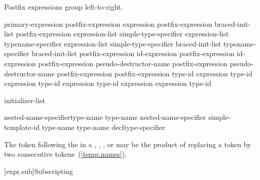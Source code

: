 \pnum
Postfix expressions group left-to-right.

\begin{bnf}
\br
    primary-expression\br
    postfix-expression \terminal{[} expression \terminal{]}\br
    postfix-expression \terminal{[} braced-init-list \terminal{]}\br
    postfix-expression \terminal{(} expression-list\opt \terminal{)}\br
    simple-type-specifier \terminal{(} expression-list\opt \terminal{)}\br
    typename-specifier \terminal{(} expression-list\opt \terminal{)}\br
    simple-type-specifier braced-init-list\br
    typename-specifier braced-init-list\br
    postfix-expression \opt id-expression\br
    postfix-expression \opt id-expression\br
    postfix-expression  pseudo-destructor-name\br
    postfix-expression \terminal{->} pseudo-destructor-name\br
    postfix-expression \terminal{++}\br
    postfix-expression \terminal{-{-}}\br
     type-id \terminal{> (} expression \terminal{)}\br
     type-id \terminal{> (} expression \terminal{)}\br
     type-id \terminal{> (} expression \terminal{)}\br
     type-id \terminal{> (} expression \terminal{)}\br
     expression \terminal{)}\br
     type-id \terminal{)}
\end{bnf}


\begin{bnf}
\br
    initializer-list
\end{bnf}


\begin{bnf}
\br
    nested-name-specifier\opt type-name \terminal{::\,\tilde} type-name\br
    nested-name-specifier  simple-template-id \terminal{::\,\tilde} type-name\br
    \terminal{\tilde} type-name\br
    \terminal{\tilde} decltype-specifier
\end{bnf}

\pnum
\enternote The \tcode{>} token following the
 in a ,
, , or
 may be the product of replacing a
\tcode{>{>}} token by two consecutive \tcode{>}
tokens~(\ref{temp.names}).\exitnote

[expr.sub]{Subscripting}

